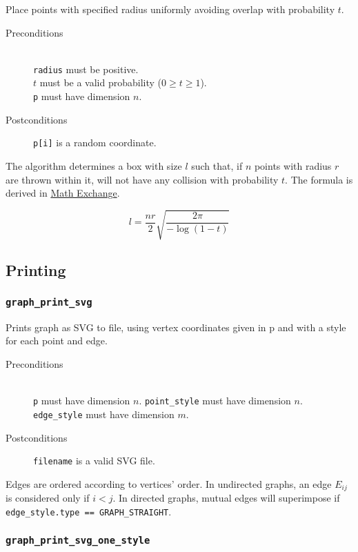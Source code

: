 \documentclass[a4paper,10pt]{article}
\begin{document}
Place points with specified radius uniformly avoiding overlap 
with probability $t$.

\begin{description}
 \item[Preconditions]~\\
   \texttt{radius} must be positive.\\
   $t$ must be a valid probability ($0 \ge t \ge 1$).\\
   \texttt{p} must have dimension $n$.
 \item[Postconditions] \texttt{p[i]} is a random coordinate.
\end{description}

The algorithm determines a box with size $l$ such that, if $n$ 
points with radius $r$ are thrown within it, will not have any 
collision with probability $t$. The formula is derived in 
\href{http://math.stackexchange.com/q/325844/37667}{Math Exchange}.

\begin{equation*}
 l = \frac{nr}{2} \sqrt{\frac{2 \pi}{-\log(1-t)}}
\end{equation*}

\subsection{Printing}

\subsubsection{\texttt{graph\_print\_svg}}

Prints graph as SVG to file, using vertex coordinates given in p and with a 
style for each point and edge.

\begin{description}
 \item[Preconditions]~\\
   \texttt{p} must have dimension $n$.
   \texttt{point\_style} must have dimension $n$.
   \texttt{edge\_style} must have dimension $m$.
 \item[Postconditions]
   \texttt{filename} is a valid SVG file.
\end{description}

Edges are ordered according to vertices' order. In undirected graphs, 
an edge $E_{ij}$ is considered only if $i < j$. In directed graphs,
mutual edges will superimpose if \texttt{edge\_style.type == GRAPH\_STRAIGHT}.

\subsubsection{\texttt{graph\_print\_svg\_one\_style}}
\end{document}
